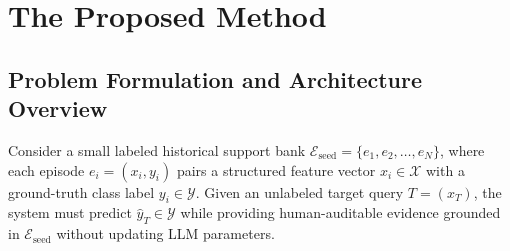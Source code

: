 \documentclass[11pt,letterpaper,onecolumn]{article}
\begin{document}
\section{The Proposed Method}
\subsection{Problem Formulation and Architecture Overview}
Consider a small labeled historical support bank $\mathcal{E}_{\mathrm{seed}} = \{e_1, e_2, \dots, e_N\}$, where each episode $e_i = (x_i, y_i)$ pairs a structured feature vector $x_i \in \mathcal{X}$ with a ground-truth class label $y_i \in \mathcal{Y}$. Given an unlabeled target query $T = (x_T)$, the system must predict $\hat{y}_T \in \mathcal{Y}$ while providing human-auditable evidence grounded in $\mathcal{E}_{\mathrm{seed}}$ without updating LLM parameters.
\end{document}
